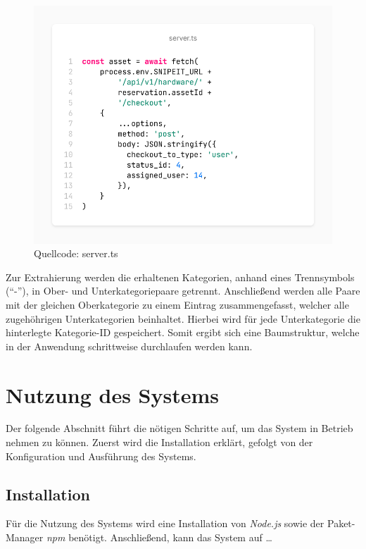 \begin{figure}[h]
  \centering
  \includegraphics[scale=0.4]{Bilder/screenshot(5).png}
  \caption[Quellcode: server.ts]{Quellcode: server.ts}
  \label{fig:categoriecode}
\end{figure}

Zur Extrahierung werden die erhaltenen Kategorien, anhand eines Trennsymbols (\enquote{-}), in Ober- und
Unterkategoriepaare getrennt. Anschließend werden alle Paare mit der gleichen Oberkategorie zu einem
Eintrag zusammengefasst, welcher alle zugehöhrigen Unterkategorien beinhaltet. Hierbei wird für jede
Unterkategorie die hinterlegte Kategorie-ID gespeichert. Somit ergibt sich eine Baumstruktur, welche
in der Anwendung schrittweise durchlaufen werden kann. 


\section{Nutzung des Systems}
Der folgende Abschnitt führt die nötigen Schritte auf, um das System in Betrieb nehmen zu können.
Zuerst wird die Installation erklärt, gefolgt von der Konfiguration und Ausführung des Systems.

\subsection{Installation}
Für die Nutzung des Systems wird eine Installation von \textit{Node.js} sowie der Paket-Manager
\textit{npm} benötigt. Anschließend, kann das System auf \dots

